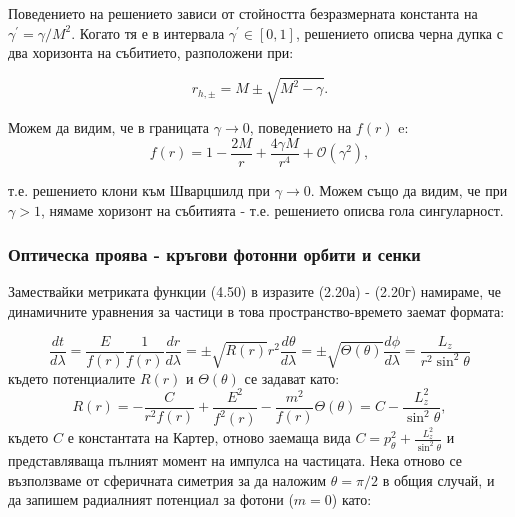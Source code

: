 Поведението на решението зависи от стойността безразмерната константа на $\gamma^\prime = \gamma/M^2$. Когато тя е в интервала $\gamma^\prime \in [0, 1]$, решението описва черна дупка с два хоризонта на събитието, разположени при:

\begin{equation}
	r_{h,\pm} = M \pm \sqrt{M^2 - \gamma}.
\end{equation}

Можем да видим, че в границата $\gamma \rightarrow 0$, поведението на $f(r)$ e:
\begin{equation}
	f(r) = 1 - \frac{2M}{r} + \frac{4\gamma M}{r^4} + \mathcal{O}(\gamma^2),
\end{equation}

т.е. решението клони към Шварцшилд при $\gamma\rightarrow 0$. Можем също да видим, че при $\gamma > 1$, нямаме хоризонт на събитията - т.е. решението описва гола сингуларност.

\subsubsection{Оптическа проява - кръгови фотонни орбити и сенки}
Замествайки метриката функции (4.50) в изразите (2.20а) - (2.20г) намираме, че динамичните уравнения за частици в това пространство-времето заемат формата:

\begin{subequations}
	\begin{equation}
		\frac{dt}{d\lambda} = \frac{E}{f(r)}
	\end{equation}
	\begin{equation}
		\frac{1}{f(r)}\frac{dr}{d\lambda} = \pm\sqrt{R(r)}
	\end{equation}
	\begin{equation}
		r^2\frac{d\theta}{d\lambda} = \pm\sqrt{\Theta(\theta)}
	\end{equation}
	\begin{equation}
		\frac{d\phi}{d\lambda} = \frac{L_z}{r^2\sin^2\theta}
	\end{equation}
\end{subequations}
където потенциалите $R(r)$ и $\Theta(\theta)$ се задават като:
\begin{subequations}
	\begin{equation}
		R(r) = -\frac{C}{r^2f(r)} + \frac{E^2}{f^2(r)} - \frac{m^2}{f(r)}
	\end{equation}
	\begin{equation}
		\Theta(\theta) = C - \frac{L_z^2}{\sin^2\theta},
	\end{equation}
\end{subequations}
където $C$ е константата на Картер, отново заемаща вида $C = p_\theta^2 + \frac{L_z^2}{\sin^2\theta}$ и представляваща пълният момент на импулса на частицата. Нека отново се възползваме от сферичната симетрия за да наложим $\theta = \pi / 2$ в общия случай, и да запишем радиалният потенциал за фотони ($m = 0$) като:

